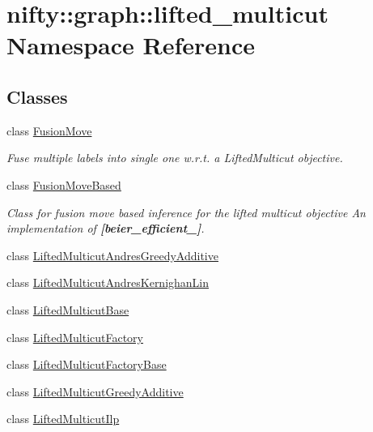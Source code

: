 \hypertarget{namespacenifty_1_1graph_1_1lifted__multicut}{}\section{nifty\+:\+:graph\+:\+:lifted\+\_\+multicut Namespace Reference}
\label{namespacenifty_1_1graph_1_1lifted__multicut}
\subsection*{Classes}
\begin{DoxyCompactItemize}
\item 
class \hyperlink{classnifty_1_1graph_1_1lifted__multicut_1_1FusionMove}{Fusion\+Move}
\begin{DoxyCompactList}\small\item\em Fuse multiple labels into single one w.\+r.\+t. a Lifted\+Multicut objective. \end{DoxyCompactList}\item 
class \hyperlink{classnifty_1_1graph_1_1lifted__multicut_1_1FusionMoveBased}{Fusion\+Move\+Based}
\begin{DoxyCompactList}\small\item\em Class for fusion move based inference for the lifted multicut objective An implementation of {\bfseries [beier\+\_\+efficient\+\_]}. \end{DoxyCompactList}\item 
class \hyperlink{classnifty_1_1graph_1_1lifted__multicut_1_1LiftedMulticutAndresGreedyAdditive}{Lifted\+Multicut\+Andres\+Greedy\+Additive}
\item 
class \hyperlink{classnifty_1_1graph_1_1lifted__multicut_1_1LiftedMulticutAndresKernighanLin}{Lifted\+Multicut\+Andres\+Kernighan\+Lin}
\item 
class \hyperlink{classnifty_1_1graph_1_1lifted__multicut_1_1LiftedMulticutBase}{Lifted\+Multicut\+Base}
\item 
class \hyperlink{classnifty_1_1graph_1_1lifted__multicut_1_1LiftedMulticutFactory}{Lifted\+Multicut\+Factory}
\item 
class \hyperlink{classnifty_1_1graph_1_1lifted__multicut_1_1LiftedMulticutFactoryBase}{Lifted\+Multicut\+Factory\+Base}
\item 
class \hyperlink{classnifty_1_1graph_1_1lifted__multicut_1_1LiftedMulticutGreedyAdditive}{Lifted\+Multicut\+Greedy\+Additive}
\item 
class \hyperlink{classnifty_1_1graph_1_1lifted__multicut_1_1LiftedMulticutIlp}{Lifted\+Multicut\+Ilp}

\end{DoxyCompactItemize}
